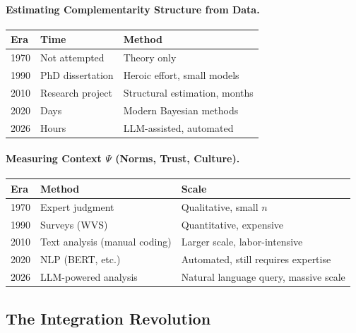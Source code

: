 \documentclass[12pt,a4paper]{article}
\begin{document}
\paragraph{Estimating Complementarity Structure from Data.}
\begin{center}
\renewcommand{\arraystretch}{1.3}
\begin{tabular}{lll}
\hline
\textbf{Era} & \textbf{Time} & \textbf{Method} \\
\hline
1970 & Not attempted & Theory only \\
1990 & PhD dissertation & Heroic effort, small models \\
2010 & Research project & Structural estimation, months \\
2020 & Days & Modern Bayesian methods \\
2026 & Hours & LLM-assisted, automated \\
\hline
\end{tabular}
\end{center}

\paragraph{Measuring Context $\Psi$ (Norms, Trust, Culture).}
\begin{center}
\renewcommand{\arraystretch}{1.3}
\begin{tabular}{lll}
\hline
\textbf{Era} & \textbf{Method} & \textbf{Scale} \\
\hline
1970 & Expert judgment & Qualitative, small $n$ \\
1990 & Surveys (WVS) & Quantitative, expensive \\
2010 & Text analysis (manual coding) & Larger scale, labor-intensive \\
2020 & NLP (BERT, etc.) & Automated, still requires expertise \\
2026 & LLM-powered analysis & Natural language query, massive scale \\
\hline
\end{tabular}
\end{center}

\subsection{The Integration Revolution}
\end{document}
